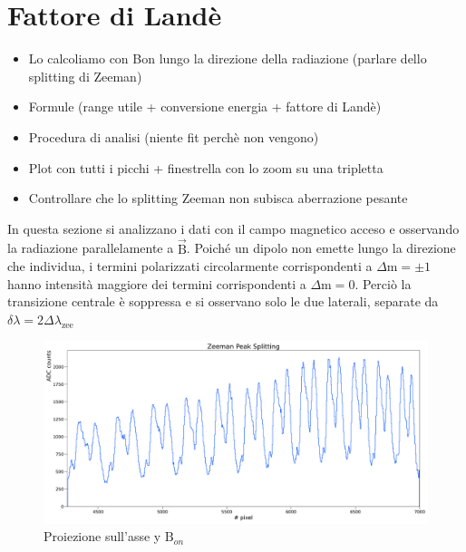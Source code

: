 \documentclass[twocolumn,10pt]{asme2ej}
\begin{document}
\section{Fattore di Landè}

\begin{itemize}
    \item Lo calcoliamo con Bon lungo la direzione della radiazione (parlare dello splitting di Zeeman)
    \item Formule (range utile + conversione energia + fattore di Landè)
    \item Procedura di analisi (niente fit perchè non vengono)
    \item Plot con tutti i picchi + finestrella con lo zoom su una tripletta 
    \item Controllare che lo splitting Zeeman non subisca aberrazione pesante
\end{itemize}
In questa sezione si analizzano i dati con il campo magnetico acceso e osservando la radiazione parallelamente a $\vec{\text{B}}$.
Poiché un dipolo non emette lungo la direzione che individua, i termini polarizzati circolarmente corrispondenti a $\Delta \text{m} = \pm 1$
hanno intensità maggiore dei termini corrispondenti a $\Delta \text{m} = 0$. Perciò la transizione centrale è soppressa e si osservano solo le due laterali,
separate da $\delta\lambda = 2 \Delta\lambda_{\text{zee}}$
 


\begin{figure}
    \centering
    \includegraphics[width=\textwidth]{../Plots/Bon_Y_proj.png}
    \caption{Proiezione sull'asse y $\text{B}_{on}$}
    \label{i:spettro2d_Bon_ProjY}
\end{figure}
\end{document}
